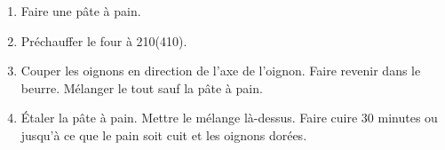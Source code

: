 
\begin{ingredients}
\end{ingredients}


\begin{recipe}
  \begin{enumerate}

  \item Faire une p\^ate \`a pain.

  \item Pr\'echauffer le four \`a 210\C (410\F).

  \item Couper les oignons en direction de l'axe de l'oignon.
    Faire revenir dans le beurre.
    M\'elanger le tout sauf la p\^ate \`a pain.

  \item \'Etaler la p\^ate \`a pain.  Mettre le m\'elange
    l\`a-dessus.  Faire cuire 30 minutes ou jusqu'\`a ce que le pain
    soit cuit et les oignons dor\'ees.

  \end{enumerate}
\end{recipe}
